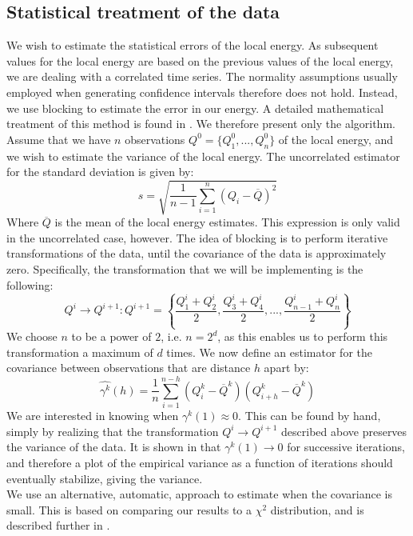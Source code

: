 \documentclass[a4paper, 10pt]{article}
\begin{document}
	\subsection{Statistical treatment of the data}\label{sec:Blocking}
	We wish to estimate the statistical errors of the local energy. As subsequent values for the local energy are based on the previous values of the local energy, we are dealing with a correlated time series. The normality assumptions usually employed when generating confidence intervals therefore does not hold. Instead, we use blocking to estimate the error in our energy. A detailed mathematical treatment of this method is found in \cite{Jonsson2018}. We therefore present only the algorithm. Assume that we have $n$ observations $Q^0=\{Q_1^0,...,Q_n^0\}$ of the local energy, and we wish to estimate the variance of the local energy. The uncorrelated estimator for the standard deviation is given by:
	\begin{equation}
	s=\sqrt{\frac{1}{n-1}\sum_{i=1}^n (Q_i-\overline{Q})^2}
	\end{equation}
	Where $\overline{Q}$ is the mean of the local energy estimates. This expression is only valid in the uncorrelated case, however. The idea of blocking is to perform iterative transformations of the data, until the covariance of the data is approximately zero. Specifically, the transformation that we will be implementing is the following:
	\begin{equation}
	Q^i \rightarrow Q^{i+1}: Q^{i+1} = \left\{ \frac{Q^i_1+Q^i_2}{2}, \frac{Q^i_3+Q^i_4}{2},...,\frac{Q^i_{n-1}+Q^i_{n}}{2}\right\}
	\end{equation}
	We choose $n$ to be a power of $2$, i.e. $n=2^d$, as this enables us to perform this transformation a maximum of $d$ times. We now define an estimator for the covariance between observations that are distance $h$ apart by:
	\begin{equation}
	\hat{\gamma^k}(h)=\frac{1}{n}\sum_{i=1}^{n-h}(Q_i^k-\overline{Q}^k)(Q_{i+h}^k-\overline{Q}^k)
	\end{equation}
	We are interested in knowing when $\gamma^k(1)\approx 0$. This can be found by hand, simply by realizing that the transformation $Q^i \rightarrow Q^{i+1}$ described above preserves the variance of the data. It is shown in \cite{Jonsson2018} that $\gamma^k(1) \rightarrow 0$ for successive iterations, and therefore a plot of the empirical variance as a function of iterations should eventually stabilize, giving the variance. \\
	\linebreak
	We use an alternative, automatic, approach to estimate when the covariance is small. This is based on comparing our results to a $\chi^2$ distribution, and is described further in \cite{Jonsson2018}.
\end{document}
